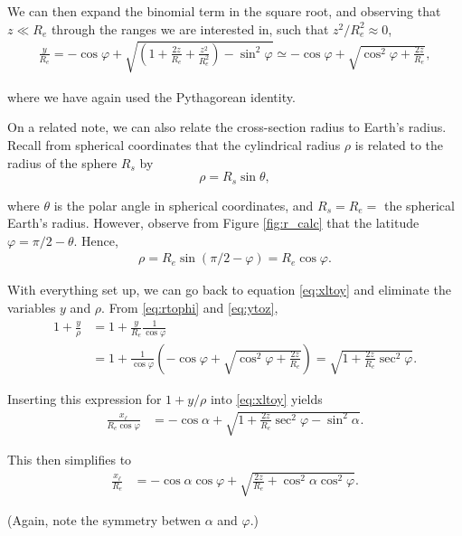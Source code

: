 \documentclass[10pt]{article}
\begin{document}
We can then expand the binomial term in the square root, and observing that $z \ll R_e$ through the ranges we are interested in, such that $z^2 / R_e^2 \approx 0$,
\begin{align}\label{eq:ytoz2}
\frac{y}{R_e} = -\cos \varphi + \sqrt{\left(1 + \frac{2z}{R_e} + \frac{z^2}{R_e^2}\right) - \sin^2 \varphi} \simeq -\cos \varphi + \sqrt{\cos^2\varphi + \frac{2z}{R_e}},
\end{align}

where we have again used the Pythagorean identity.

\vspace{10pt} On a related note, we can also relate the cross-section radius to Earth's radius. Recall from spherical coordinates that the cylindrical radius $\rho$ is related to the radius of the sphere $R_s$ by
$$
\rho = R_s \sin \theta,
$$

where $\theta$ is the polar angle in spherical coordinates, and $R_s = R_e =$ the spherical Earth's radius. However, observe from Figure \ref{fig:r_calc} that the latitude $\varphi = \pi/2 - \theta$. Hence,
\begin{align} \label{eq:rtophi}
\rho = R_e \sin (\pi/2 - \varphi) = R_e \cos \varphi.
\end{align}

With everything set up, we can go back to equation \eqref{eq:xltoy} and eliminate the variables $y$ and $\rho$. From \eqref{eq:rtophi} and \eqref{eq:ytoz},
\begin{align}
1+\frac{y}{\rho} &= 1 + \frac{y}{R_e}\frac{1}{\cos \varphi} \nonumber \\
&= 1 + \frac{1}{\cos \varphi} \left( -\cos \varphi + \sqrt{\cos^2\varphi + \frac{2z}{R_e}}\right) = \sqrt{1 + \frac{2z}{R_e} \sec^2 \varphi}.
\end{align}

Inserting this expression for $1+y/\rho$ into \eqref{eq:xltoy} yields
\begin{align*}
\frac{x_{\ell}}{R_e \cos \varphi} &= -\cos \alpha + \sqrt{1 + \frac{2z}{R_e} \sec^2 \varphi - \sin^2 \alpha}.
\end{align*}

This then simplifies to
\begin{align} \label{xltoz_ALL}
\frac{x_{\ell}}{R_e} &= -\cos \alpha \cos \varphi + \sqrt{\frac{2z}{R_e} + \cos^2\alpha \cos^2\varphi}.
\end{align}

(Again, note the symmetry betwen $\alpha$ and $\varphi$.)
\end{document}
